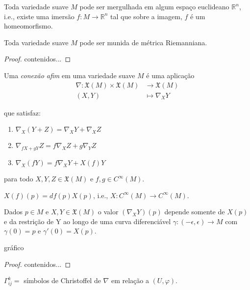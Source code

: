 \begin{teo}[Nash]
	Toda variedade suave $M$ pode ser mergulhada em algum espaço euclideano $\mathbb{R}^n$, i.e., existe uma imersão $f: M \rightarrow \mathbb{R}^n$ tal que sobre a imagem, $f$ é um homeomorfismo.
\end{teo}

\begin{corolario}
	Toda variedade suave $M$ pode ser munida de métrica Riemanniana.
\end{corolario}

\begin{proof}
	contenidos...
\end{proof}

\begin{defi}
	Uma \emph{conexão afim} em uma variedade suave $M$ é uma aplicação
	\begin{align*}
		\nabla: \mathfrak{X}(M) \times \mathfrak{X}(M) & \rightarrow \mathfrak{X}(M)\\
		(X,Y) & \mapsto \nabla_X Y
	\end{align*}
	
	que satisfaz:
	\begin{enumerate}
		\item $\nabla_X (Y+Z) = \nabla_X Y + \nabla_X Z$
		\item $\nabla_{fX+gY} Z = f \nabla_X Z + g \nabla_Y Z $
		\item $\nabla_X (fY) = f \nabla_X Y + X(f) Y$
	\end{enumerate}

para todo $X,Y,Z \in \mathfrak{X}(M)$ e $f,g \in C^{\infty}(M)$.
\end{defi}

\begin{lembrete}
	$X(f)(p) = df(p)X(p)$, i.e., $X: C^{\infty}(M) \rightarrow C^{\infty}(M)$.
\end{lembrete}

\begin{prop}
	Dados $p \in M$ e $X,Y \in \mathfrak{X}(M)$ o valor $(\nabla_X Y)(p)$ depende somente de $X(p)$ e da restrição de Y ao longo de uma curva diferenciável $\gamma: (-\epsilon, \epsilon) \rightarrow M$ com $\gamma(0)=p$ e $\gamma'(0)=X(p)$.
	
	gráfico
\end{prop}

\begin{proof}
	contenidos...
\end{proof}

\begin{nota}
	$\Gamma_{ij}^k =$ símbolos de Christoffel de $\nabla$ em relação a $(U,\varphi)$.
\end{nota}

